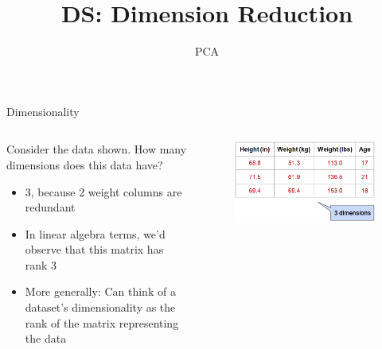 \documentclass[aspectratio=169]{../latex_main/tntbeamer}  %
\title[Introduction]{DS: Dimension Reduction}
\subtitle{PCA}
\begin{document}
	
	\maketitle
	\begin{frame}{Dimensionality}
	    \begin{columns}
	        \begin{column}{.5\textwidth}
	               Consider the data shown. How many dimensions does this data have?
	               \begin{itemize}
	                   \item 3, because 2 weight columns are redundant
	                   \item In linear algebra terms, we’d observe that this matrix has rank 3
	                   \item More generally: Can think of a dataset’s dimensionality as the rank of the matrix representing the data 
	               \end{itemize}
	        \end{column}
	        
	        
	        \begin{column}{.5\textwidth}
	                \begin{figure}
	                    \centering
	                    \includegraphics[scale=.4]{Bild4}
	                \end{figure}
	        \end{column}
	    \end{columns}
	\end{frame}
	
\end{document}
